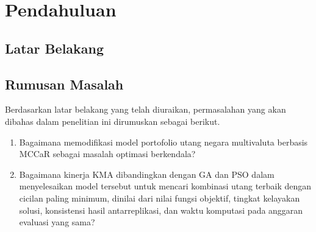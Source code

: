 \chapter{Pendahuluan}\label{ch:introduction}

    \section{Latar Belakang}\label{sec:background}

    \section{Rumusan Masalah}\label{sec:problem}

        Berdasarkan latar belakang yang telah diuraikan, permasalahan yang akan dibahas dalam penelitian ini dirumuskan sebagai berikut.
        \begin{enumerate}
            \item Bagaimana memodifikasi model portofolio utang negara multivaluta berbasis MCCaR sebagai masalah optimasi berkendala?
            \item Bagaimana kinerja KMA dibandingkan dengan GA dan PSO dalam menyelesaikan model tersebut untuk mencari kombinasi utang terbaik dengan cicilan paling minimum, dinilai dari nilai fungsi objektif, tingkat kelayakan solusi, konsistensi hasil antarreplikasi, dan waktu komputasi pada anggaran evaluasi yang sama?
        \end{enumerate}

